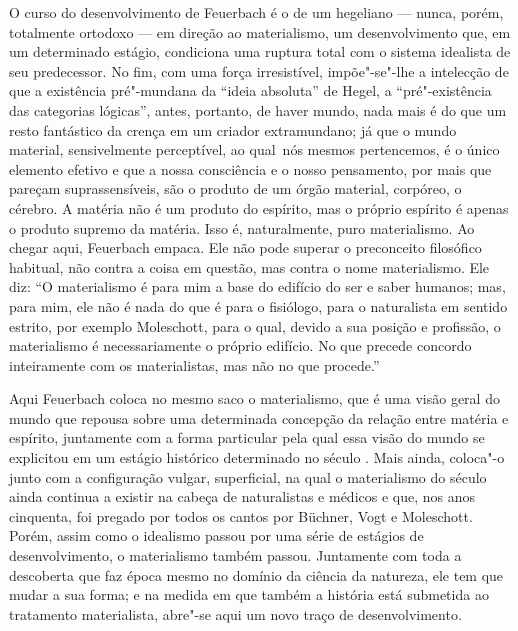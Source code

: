 O curso do desenvolvimento
de Feuerbach é
o de um hegeliano --- nunca, porém, totalmente ortodoxo --- em direção ao
materialismo, um desenvolvimento que, em um determinado estágio,
condiciona uma ruptura total com o sistema idealista de seu predecessor.
No fim, com uma força irresistível, impõe"-se"-lhe a intelecção de que a
existência pré"-mundana da ``ideia absoluta''
de Hegel,
a ``pré"-existência das categorias lógicas'', antes, portanto, de haver
mundo, nada mais é do que um resto fantástico da crença em um criador
extramundano; já que o mundo material, sensivelmente perceptível, ao
qual\est\ nós mesmos pertencemos, é o único elemento efetivo e que a nossa
consciência e o nosso pensamento, por mais que pareçam suprassensíveis, são o
produto de um órgão material, corpóreo, o cérebro. A matéria não é um
produto do espírito, mas o próprio espírito é apenas 
o produto supremo da matéria. Isso é, naturalmente, 
puro materialismo. Ao chegar aqui, Feuerbach empaca. Ele não pode
superar o preconceito filosófico habitual, não contra a
coisa em questão, mas contra o nome materialismo. Ele diz: ``O
materialismo é para mim a base do edifício do ser e saber humanos; mas,
para mim, ele não é nada do que é para o fisiólogo, para o naturalista em
sentido estrito, por exemplo Moleschott,
para o qual, devido a sua posição e profissão, o materialismo é necessariamente o próprio
edifício. No que precede concordo inteiramente com os materialistas, mas
não no que procede.''

Aqui
Feuerbach coloca
no mesmo saco o materialismo, que é uma visão geral do mundo que repousa
sobre uma determinada concepção da relação entre matéria e espírito,
juntamente com a forma particular pela qual essa visão do mundo se
explicitou em um estágio histórico determinado \textbar{} no século  \textbar{}. %
Mais ainda, coloca"-o junto com a configuração vulgar, superficial, na qual
o materialismo do século  ainda continua a existir na cabeça
de naturalistas e médicos e que, nos anos cinquenta, foi pregado por
todos os cantos
por Büchner, Vogt e Moleschott. Porém,
assim como o idealismo passou por uma série de estágios de
desenvolvimento, o materialismo também passou. Juntamente com toda a descoberta
que faz época mesmo no domínio da ciência da natureza, ele tem que mudar
a sua forma; e na medida em que também a história está submetida ao
tratamento materialista, abre"-se aqui um novo traço de
desenvolvimento.

